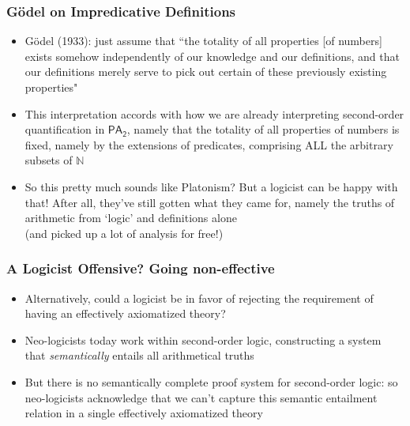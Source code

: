 \begin{frame}
\frametitle{G\"odel on Impredicative Definitions}

\begin{itemize}[<+->]

\item G\"odel (1933): just assume that ``the totality of all properties [of numbers] exists somehow independently of our knowledge and our definitions, and that our definitions merely serve to pick out certain of these previously existing properties"

\item This interpretation accords with how we are already interpreting second-order quantification in $\mathsf{PA_2}$, namely that the totality of all properties of numbers is fixed, namely by the extensions of predicates, comprising ALL the arbitrary subsets of $\mathbb{N}$

\item So this pretty much sounds like Platonism? But a logicist can be happy with that! After all, they've still gotten what they came for, namely the truths of arithmetic from `logic' and definitions alone \\ (and picked up a lot of analysis for free!) %

\end{itemize}
\end{frame}


\iffalse %

\begin{frame}
\frametitle{A Logicist Offensive? Going non-effective}


\begin{itemize}[<+->]

\item Alternatively, could a logicist be in favor of rejecting the requirement of having an effectively axiomatized theory? 

\item Neo-logicists today work within second-order logic, constructing a system that \textit{semantically} entails all arithmetical truths

\item But there is no semantically complete proof system for second-order logic: so neo-logicists acknowledge that we can't capture this semantic entailment relation in a single effectively axiomatized theory 

\end{itemize}
\end{frame}

